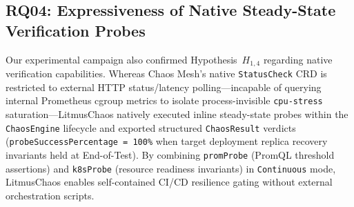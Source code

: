 \subsection{RQ04: Expressiveness of Native Steady-State Verification Probes}
Our experimental campaign also confirmed Hypothesis~$H_{1,4}$ regarding native verification capabilities. Whereas Chaos Mesh's native \texttt{StatusCheck} CRD is restricted to external HTTP status/latency polling—incapable of querying internal Prometheus cgroup metrics to isolate process-invisible \texttt{cpu-stress} saturation—LitmusChaos natively executed inline steady-state probes within the \texttt{ChaosEngine} lifecycle and exported structured \texttt{ChaosResult} verdicts (\texttt{probeSuccessPercentage = 100\%} when target deployment replica recovery invariants held at End-of-Test). By combining \texttt{promProbe} (PromQL threshold assertions) and \texttt{k8sProbe} (resource readiness invariants) in \texttt{Continuous} mode, LitmusChaos enables self-contained CI/CD resilience gating without external orchestration scripts.